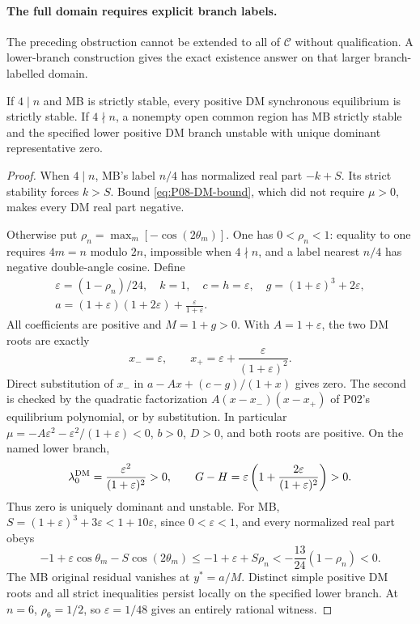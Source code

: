\paragraph{The full domain requires explicit branch labels.}
The preceding obstruction cannot be extended to all of $\mathcal C$
without qualification. A lower-branch construction gives the exact
existence answer on that larger branch-labelled domain.
\begin{proposition}
\label{prop:P08-lower}
If $4\mid n$ and MB is strictly stable, every positive DM synchronous
equilibrium is strictly stable. If $4\nmid n$, a nonempty open common
region has MB strictly stable and the specified lower positive DM
branch unstable with unique dominant representative zero.
\end{proposition}
\begin{proof}
When $4\mid n$, MB's label $n/4$ has normalized real part $-k+S$.
Its strict stability forces $k>S$. Bound \eqref{eq:P08-DM-bound},
which did not require $\mu>0$, makes every DM real part negative.

Otherwise put $\rho_n=\max_m[-\cos(2\theta_m)]$. One has
$0<\rho_n<1$: equality to one requires $4m=n$ modulo $2n$, impossible
when $4\nmid n$, and a label nearest $n/4$ has negative double-angle
cosine. Define
\begin{equation}
\begin{gathered}
 \varepsilon=(1-\rho_n)/24,\quad k=1,\quad c=h=\varepsilon,\quad
 g=(1+\varepsilon)^3+2\varepsilon,\\
 a=(1+\varepsilon)(1+2\varepsilon)
                         +\frac{\varepsilon}{1+\varepsilon}.
\end{gathered}\label{eq:P08-lower-family}
\end{equation}
All coefficients are positive and $M=1+g>0$. With $A=1+\varepsilon$,
the two DM roots are exactly
\[
 x_-=\varepsilon,\qquad
 x_+=\varepsilon+\frac{\varepsilon}{(1+\varepsilon)^2}.
\]
Direct substitution of $x_-$ in $a-Ax+(c-g)/(1+x)$ gives zero.
The second is checked by the quadratic factorization
$A(x-x_-)(x-x_+)$ of P02's equilibrium polynomial, or by substitution.
In particular $\mu=-A\varepsilon^2-\varepsilon^2/(1+\varepsilon)<0$,
$b>0$, $D>0$, and both roots are positive. On the named lower branch,
\[
 \lambda_0^{\mathrm{DM}}=\frac{\varepsilon^2}{(1+\varepsilon)^2}>0,
 \qquad G-H=\varepsilon\left(1+
                       \frac{2\varepsilon}{(1+\varepsilon)^2}\right)>0.
\]
Thus zero is uniquely dominant and unstable. For MB,
$S=(1+\varepsilon)^3+3\varepsilon<1+10\varepsilon$, since
$0<\varepsilon<1$, and every normalized real part obeys
\[
 -1+\varepsilon\cos\theta_m-S\cos(2\theta_m)
 \le-1+\varepsilon+S\rho_n
 <-\frac{13}{24}(1-\rho_n)<0.
\]
The MB original residual vanishes at $y^*=a/M$. Distinct simple
positive DM roots and all strict inequalities persist locally on the
specified lower branch. At $n=6$, $\rho_6=1/2$, so
$\varepsilon=1/48$ gives an entirely rational witness.
\end{proof}

